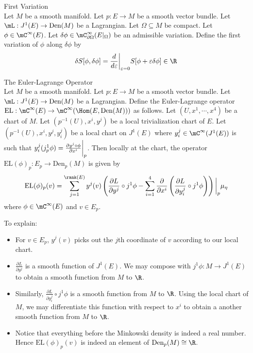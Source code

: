 \documentclass[a4paper]{article}
\begin{document}
\begin{defn}{First Variation}{}\\
Let $M$ be a smooth manifold. Let $p:E\to M$ be a smooth vector bundle. Let $\mL:J^1(E)\to\text{Den}(M)$ be a Lagrangian. Let $\Omega\subseteq M$ be compact. Let $\phi\in\mC^\infty(E)$. Let $\delta\phi\in\mC^\infty_{\partial\Omega}(E|_{\Omega})$ be an admissible variation. Define the first variation of $\phi$ along $\delta\phi$ by $$\delta S[\phi,\delta\phi]=\frac{d}{d\varepsilon}\bigg{|}_{\varepsilon=0}S[\phi+\varepsilon\delta\phi]\in\R$$
\end{defn}

\begin{defn}{The Euler-Lagrange Operator}{}\\
Let $M$ be a smooth manifold. Let $p:E\to M$ be a smooth vector bundle. Let $\mL:J^1(E)\to\text{Den}(M)$ be a Lagrangian. Define the Euler-Lagrange operator $\text{EL}:\mC^\infty(E)\to\mC^\infty(\Hom(E,\text{Den}(M)))$ as follows. Let $(U,x^1,\cdots,x^4)$ be a chart of $M$. Let $(p^{-1}(U),x^i,y^j)$ be a local trivialization chart of $E$. Let $(p^{-1}(U),x^i,y^j,y_i^j)$ be a local chart on $J^1(E)$ where $y_i^j\in\mC^\infty(J^1(E))$ is such that $y_i^j(j_p^1\phi)=\frac{\partial y^j\circ\phi}{\partial x^i}\bigg{|}_p$. Then locally at the chart, the operator $\text{EL}(\phi)_p:E_p\to\text{Den}_p(M)$ is given by $$\text{EL}(\phi)_p(v)=\sum_{j=1}^{\rank(E)}y^j(v)\left(\frac{\partial L}{\partial y^j}\circ j^1\phi-\sum_{i=1}^4\frac{\partial}{\partial x^i}\left(\frac{\partial L}{\partial y_i^j}\circ j^1\phi\right)\right)\bigg{|}_p\mu_\eta$$ where $\phi\in\mC^\infty(E)$ and $v\in E_p$. 
\end{defn}

To explain: 
\begin{itemize}
\item For $v\in E_p$, $y^j(v)$ picks out the $j$th coordinate of $v$ according to our local chart. 
\item $\frac{\partial L}{\partial y^j}$ is a smooth function of $J^1(E)$. We may compose with $j^1\phi:M\to J^1(E)$ to obtain a smooth function from $M$ to $\R$. 
\item Similarly, $\frac{\partial L}{\partial y_i^j}\circ j^1\phi$ is a smooth function from $M$ to $\R$. Using the local chart of $M$, we may differentiate this function with respect to $x^i$ to obtain a another smooth function from $M$ to $\R$. 
\item Notice that everything before the Minkowski density is indeed a real number. Hence $\text{EL}(\phi)_p(v)$ is indeed an element of $\text{Den}_p(M)\cong\R$. 
\end{itemize}
\end{document}
